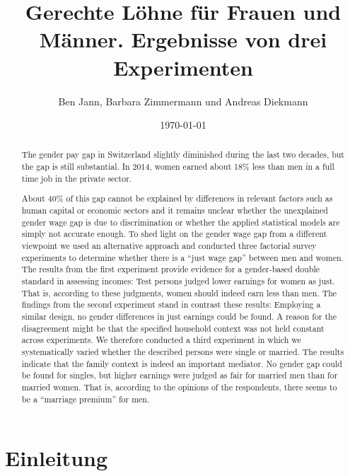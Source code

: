 \documentclass[a4paper,12pt]{article}
\renewcommand{\baselinestretch}{1.1}
\newif\ifcomments
\newcommand{\comment}[1]{%
    \ifcomments\marginpar{\renewcommand{\baselinestretch}{1}\tiny\hspace*{-1.1em}\colorbox{gray!20}%
    {\textcolor{red}{\parbox[t]{.9in}{\raggedright #1}}}}\fi}
\begin{document}
\title{Gerechte Löhne für Frauen und Männer. Ergebnisse von drei Experimenten}
\author{Ben Jann, Barbara Zimmermann und Andreas Diekmann}
\date{\today}
\maketitle

\tableofcontents

\newpage
\begin{abstract}
    \comment{Deutschen Abstract hinzufügen ...}
    
    The gender pay gap in Switzerland slightly diminished during the last two
    decades, but the gap is still substantial. In 2014, women earned about 18\%
    less than men in a full time job in the private sector. \comment{Zahlen aktualisieren?}
    About 40\% of this gap cannot be explained
    by differences in relevant factors such as human capital or economic
    sectors and it remains unclear whether the unexplained gender wage gap is
    due to discrimination or whether the applied statistical models are simply
    not accurate enough. To shed light on the gender wage gap from a different
    viewpoint we used an alternative approach and conducted three factorial
    survey experiments to determine whether there is a “just wage gap” between
    men and women. The results from the first experiment provide evidence for a
    gender-based double standard in assessing incomes: Test persons judged
    lower earnings for women as just. That is, according to these judgments,
    women should indeed earn less than men. The findings from the second
    experiment stand in contrast these results: Employing a similar design, no
    gender differences in just earnings could be found. A reason for the
    disagreement might be that the specified household context was not held
    constant across experiments. We therefore conducted a third experiment in
    which we systematically varied whether the described persons were single or
    married. The results indicate that the family context is indeed an
    important mediator. No gender gap could be found for singles, but higher
    earnings were judged as fair for married men than for married women. That
    is, according to the opinions of the respondents, 
    there seems to be a “marriage premium” for men.
\end{abstract}

\newpage
\section{Einleitung}
\end{document}
